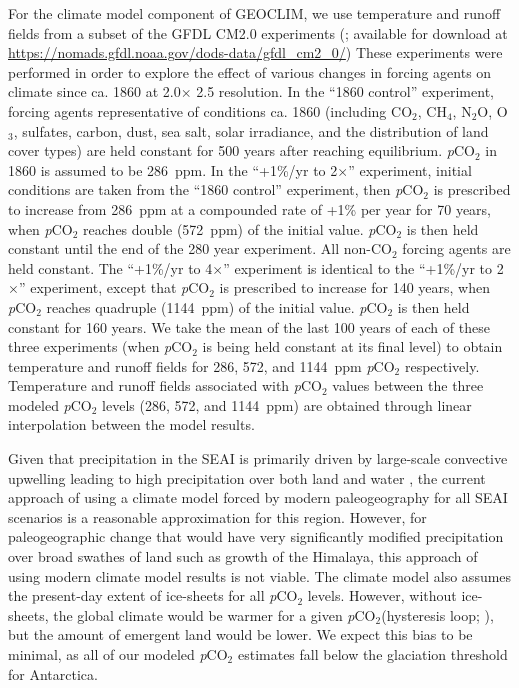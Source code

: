 \documentclass[11pt,letterpaper]{article}
\newcommand{\degrees}{\textdegree\xspace}
\newcommand{\pCOtwo}{\textit{p}CO$_{2}$\xspace}
\newcommand{\COtwo}{CO$_{2}$\xspace}
\begin{document}
For the climate model component of GEOCLIM, we use temperature and runoff fields from a subset of the GFDL CM2.0 experiments (\citealp{Delworth2006a, Delworth2006b}; available for download at \url{https://nomads.gfdl.noaa.gov/dods-data/gfdl_cm2_0/}) These experiments were performed in order to explore the effect of various changes in forcing agents on climate since ca. 1860 at 2.0\degrees $\times$ 2.5\degrees resolution. In the ``1860 control'' experiment, forcing agents representative of conditions ca. 1860 (including \COtwo, CH$_{4}$, N$_{2}$O, O$_{3}$, sulfates, carbon, dust, sea salt, solar irradiance, and the distribution of land cover types) are held constant for 500 years after reaching equilibrium. \pCOtwo in 1860 is assumed to be 286~ppm. In the ``+1\%/yr to 2$\times$'' experiment, initial conditions are taken from the ``1860 control'' experiment, then \pCOtwo is prescribed to increase from 286~ppm at a compounded rate of +1\% per year for 70 years, when \pCOtwo reaches double (572~ppm) of the initial value. \pCOtwo is then held constant until the end of the 280 year experiment. All non-\COtwo forcing agents are held constant. The ``+1\%/yr to 4$\times$'' experiment is identical to the ``+1\%/yr to 2$\times$'' experiment, except that \pCOtwo is prescribed to increase for 140 years, when \pCOtwo reaches quadruple (1144~ppm) of the initial value. \pCOtwo is then held constant for 160 years. We take the mean of the last 100 years of each of these three experiments (when \pCOtwo is being held constant at its final level) to obtain temperature and runoff fields for 286, 572, and 1144~ppm \pCOtwo respectively. Temperature and runoff fields associated with \pCOtwo values between the three modeled \pCOtwo levels (286, 572, and 1144~ppm) are obtained through linear interpolation between the model results.

Given that precipitation in the SEAI is primarily driven by large-scale convective upwelling leading to high precipitation over both land and water \citep{Donohoe2017a}, the current approach of using a climate model forced by modern paleogeography for all SEAI scenarios is a reasonable approximation for this region. However, for paleogeographic change that would have very significantly modified precipitation over broad swathes of land such as growth of the Himalaya, this approach of using modern climate model results is not viable. The climate model also assumes the present-day extent of ice-sheets for all \pCOtwo levels. However, without ice-sheets, the global climate would be warmer for a given \pCOtwo (hysteresis loop; \citealp{Pollard2005b}), but the amount of emergent land would be lower. We expect this bias to be minimal, as all of our modeled \pCOtwo estimates fall below the glaciation threshold for Antarctica.
\end{document}

